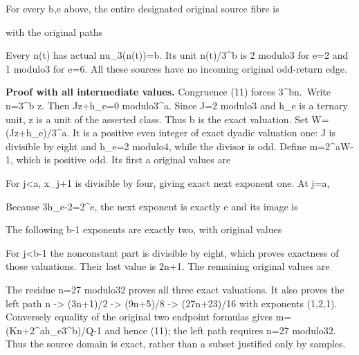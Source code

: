 For every b,e above, the entire designated original source fibre is


with the original paths


Every n(t) has actual nu\_3(n(t))=b. Its unit n(t)/3\^{}b is 2 modulo3
for e=2 and 1 modulo3 for e=6. All these sources have no incoming
original odd-return edge.

\textbf{Proof with all intermediate values.} Congruence (11) forces
3\^{}b\textbar n.~Write n=3\^{}b z. Then Jz+h\_e=0 modulo3\^{}a. Since
J=2 modulo3 and h\_e is a ternary unit, z is a unit of the asserted
class. Thus b is the exact valuation. Set W=(Jz+h\_e)/3\^{}a. It is a
positive even integer of exact dyadic valuation one: J is divisible by
eight and h\_e=2 modulo4, while the divisor is odd. Define m=2\^{}aW-1,
which is positive odd. Its first a original values are


For j\textless a, x\_j+1 is divisible by four, giving exact next
exponent one. At j=a,


Because 3h\_e-2=2\^{}e, the next exponent is exactly e and its image is


The following b-1 exponents are exactly two, with original values


For j\textless b-1 the nonconstant part is divisible by eight, which
proves exactness of those valuations. Their last value is 2n+1. The
remaining original values are


The residue n=27 modulo32 proves all three exact valuations. It also
proves the left path n -\textgreater{} (3n+1)/2 -\textgreater{} (9n+5)/8
-\textgreater{} (27n+23)/16 with exponents (1,2,1). Conversely equality
of the original two endpoint formulas gives m=(Kn+2\^{}ah\_e3\^{}b)/Q-1
and hence (11); the left path requires n=27 modulo32. Thus the source
domain is exact, rather than a subset justified only by samples.


